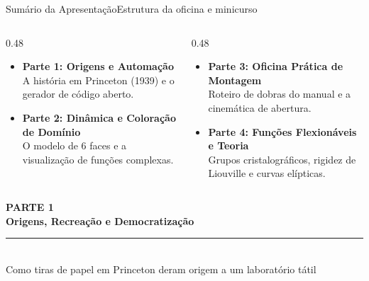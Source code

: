 \documentclass[aspectratio=169, 11pt, utf8]{beamer}
\newcommand{\capaparte}[3]{%
  \begin{frame}[plain]
    \begin{center}
      \vspace{1.2cm}
      {\scriptsize\bfseries\color{EnimarTeal} PARTE #1}\\[0.35cm]
      {\LARGE\bfseries\color{EnimarNavy} #2}\\[0.3cm]
      {\color{EnimarTeal!40}\rule{4.5cm}{0.8pt}}\\[0.45cm]
      {\normalsize\color{EnimarText} #3}
    \end{center}
  \end{frame}
}
\begin{document}
\begin{frame}{Sumário da Apresentação}{Estrutura da oficina e minicurso}
  \begin{columns}[c]
    \begin{column}{0.48\textwidth}
      \begin{itemize}
        \setlength{\itemsep}{14pt}
        \item \textbf{\color{EnimarNavy}Parte 1: Origens e Automação}\\[2pt]
        {\small A história em Princeton (1939) e o gerador de código aberto.}
        
        \item \textbf{\color{EnimarNavy}Parte 2: Dinâmica e Coloração de Domínio}\\[2pt]
        {\small O modelo de 6 faces e a visualização de funções complexas.}
      \end{itemize}
    \end{column}

    \begin{column}{0.48\textwidth}
      \begin{itemize}
        \setlength{\itemsep}{14pt}
        \item \textbf{\color{EnimarNavy}Parte 3: Oficina Prática de Montagem}\\[2pt]
        {\small Roteiro de dobras do manual e a cinemática de abertura.}
        
        \item \textbf{\color{EnimarNavy}Parte 4: Funções Flexionáveis e Teoria}\\[2pt]
        {\small Grupos cristalográficos, rigidez de Liouville e curvas elípticas.}
      \end{itemize}
    \end{column}
  \end{columns}
\end{frame}

\capaparte{1}{Origens, Recreação e Democratização}{Como tiras de papel em Princeton deram origem a um laboratório tátil}
\end{document}
